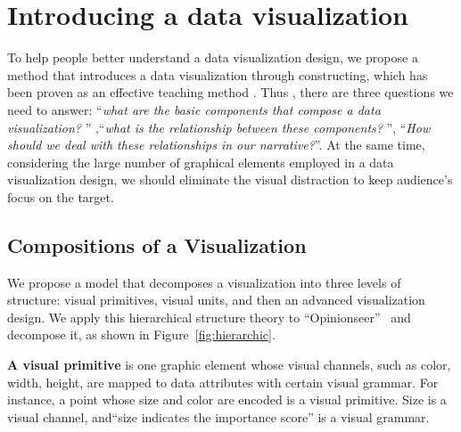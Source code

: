 \section{Introducing a data visualization} \label{analysis}
To help people better understand a data visualization design, we propose a method that introduces a data visualization through constructing, which has been proven as an effective teaching method\cite{huron_constructive_2014, chapman_constructive_1988} . Thus , there are three questions we need to answer: ``\textit{what are the basic components that compose a data visualization? }'' ,``\textit{what is the relationship between these components? }'', ``\textit{How should we deal with these relationships in our narrative?}''. At the same time, considering the large number of graphical elements employed in a data visualization design, we should eliminate the visual distraction to keep audience's focus on the target.

\subsection{Compositions of a Visualization}\label{compositions}
We propose a model that decomposes a visualization into three levels of structure: visual primitives, visual units, and then an advanced visualization design. 
We apply this hierarchical structure theory to ``Opinionseer''~\cite{wu_opinionseer:_2010} and decompose it, as shown in Figure~\ref{fig:hierarchic}. 

\textbf{A visual primitive} is one graphic element whose visual channels, such as color, width, height, are mapped to data attributes with certain visual grammar.  For instance, a point whose size and color are encoded  is a visual primitive. Size is a visual channel, and``size indicates the importance score'' is a visual grammar. 

